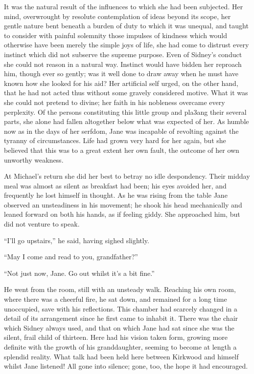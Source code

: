 It was the natural result of the influences to which she had been
subjected. Her mind, overwrought by resolute contemplation of ideas
beyond its scope, her gentle nature bent {}beneath a burden of duty to
which it was unequal, and taught to consider with painful solemnity
those impulses of kindness which would otherwise have been merely the
simple joys of life, she had come to distrust every instinct which did
not subserve the supreme purpose. Even of Sidney's conduct she could not
reason in a natural way. Instinct would have bidden her reproach him,
though ever so gently; was it well done to draw away when he must have
known how she looked for his aid? Her artificial self urged, on the
other hand, that he had not acted thus without some gravely considered
motive. What it was she could not pretend to divine; her faith in his
nobleness overcame every perplexity. Of the persons constituting this
little group and pla3ang their several parts, she alone had fallen
altogether below what was expected of her. As humble now as in the days
of her serfdom, Jane was incapable of revolting against the tyranny of
circumstances. Life had grown very hard for her again, but she believed
that this was to a great extent her own fault, the outcome of her own
unworthy weakness.

{}At Michael's return she did her best to betray no idle despondency.
Their midday meal was almost as silent as breakfast had been; his eyes
avoided her, and frequently he lost himself in thought. As he was rising
from the table Jane observed an unsteadiness in his movement; he shook
his head mechanically and leaned forward on both his hands, as if
feeling giddy. She approached him, but did not venture to speak.

``I'll go upstairs,'' he said, having sighed slightly.

``May I come and read to you, grandfather?''

``Not just now, Jane. Go out whilst it's a bit fine.''

He went from the room, still with an unsteady walk. Reaching his own
room, where there was a cheerful fire, he sat down, and remained for a
long time unoccupied, save with his reflections. This chamber had
scarcely changed in a detail of its arrangement since he first came to
inhabit it. There was the chair which Sidney always used, and that on
which Jane had sat since she was the silent, frail child of thirteen.
Here had his vision taken form, growing more definite with the growth of
his {}granddaughter, seeming to become at length a splendid reality.
What talk had been held here between Kirkwood and himself whilst Jane
listened! All gone into silence; gone, too, the hope it had encouraged.

